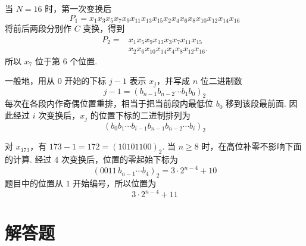 \begin{solution}
当 \(N=16\) 时，第一次变换后
\[
P_1=x_1x_3x_5x_7x_9x_{11}x_{13}x_{15}x_2x_4x_6x_8x_{10}x_{12}x_{14}x_{16}
\]
将前后两段分别作 \(C\) 变换，得到
\[
\begin{aligned}
P_2={}&x_1x_5x_9x_{13}x_3x_7x_{11}x_{15}\\
{}&x_2x_6x_{10}x_{14}x_4x_8x_{12}x_{16}.
\end{aligned}
\]
所以 \(x_7\) 位于第 \(6\) 个位置.

一般地，用从 \(0\) 开始的下标 \(j-1\) 表示 \(x_j\)，并写成 \(n\) 位二进制数
\[
j-1=(b_{n-1}b_{n-2}\cdots b_1b_0)_2
\]
每次在各段内作奇偶位置重排，相当于把当前段内最低位 \(b_0\) 移到该段最前面. 因此经过 \(i\) 次变换后，\(x_j\) 的位置下标的二进制排列为
\[
(b_0b_1\cdots b_{i-1}b_{n-1}b_{n-2}\cdots b_i)_2
\]

对 \(x_{173}\)，有 \(173-1=172=(10101100)_2\). 当 \(n\geqslant8\) 时，在高位补零不影响下面的计算. 经过 \(4\) 次变换后，位置的零起始下标为
\[
(0011\,b_{n-1}\cdots b_4)_2=3\cdot2^{n-4}+10
\]
题目中的位置从 \(1\) 开始编号，所以位置为
\[
3\cdot2^{n-4}+11
\]
\end{solution}

\section{解答题}


